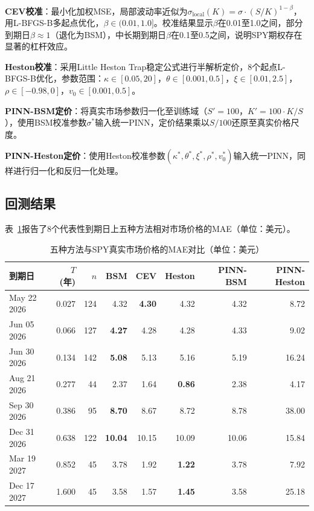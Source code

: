 \textbf{CEV校准}：最小化加权MSE，局部波动率近似为$\sigma_\text{local}(K)=\sigma\cdot(S/K)^{1-\beta}$，用L-BFGS-B多起点优化，$\beta\in(0.01,1.0]$。校准结果显示$\beta$在0.01至1.0之间，部分到期日$\beta\approx 1$（退化为BSM），中长期到期日$\beta$在0.1至0.5之间，说明SPY期权存在显著的杠杆效应。

\textbf{Heston校准}：采用Little Heston Trap稳定公式\cite{albrecher2007little}进行半解析定价，8个起点L-BFGS-B优化，参数范围：$\kappa\in[0.05,20]$，$\theta\in[0.001,0.5]$，$\xi\in[0.01,2.5]$，$\rho\in[-0.98,0]$，$v_0\in[0.001,0.5]$。

\textbf{PINN-BSM定价}：将真实市场参数归一化至训练域（$S'=100$，$K'=100\cdot K/S$），使用BSM校准参数$\sigma^*$输入统一PINN，定价结果乘以$S/100$还原至真实价格尺度。

\textbf{PINN-Heston定价}：使用Heston校准参数$(\kappa^*,\theta^*,\xi^*,\rho^*,v_0^*)$输入统一PINN，同样进行归一化和反归一化处理。

\subsection{回测结果}

表~\ref{tab:market_results}报告了8个代表性到期日上五种方法相对市场价格的MAE（单位：美元）。

\begin{table}[htbp]
  \centering
  \caption{五种方法与SPY真实市场价格的MAE对比（单位：美元）}
  \label{tab:market_results}
  \begin{tabular}{lrrrrrrr}
    \hline
    到期日 & $T$(年) & $n$ & BSM & CEV & Heston & PINN-BSM & PINN-Heston \\
    \hline
    May 22 2026 & 0.027 & 124 & 4.32 & \textbf{4.30} & 4.32 & 4.32 & 8.72 \\
    Jun 05 2026 & 0.066 & 127 & \textbf{4.27} & 4.28 & 4.28 & 4.33 & 9.02 \\
    Jun 30 2026 & 0.134 & 142 & \textbf{5.08} & 5.13 & 5.16 & 5.19 & 16.24 \\
    Aug 21 2026 & 0.277 &  44 & 2.37 & 1.64 & \textbf{0.86} & 2.38 & 4.17 \\
    Sep 30 2026 & 0.386 &  95 & \textbf{8.70} & 8.67 & 8.72 & 8.78 & 38.00 \\
    Dec 31 2026 & 0.638 & 122 & \textbf{10.04} & 10.15 & 10.09 & 10.06 & 15.84 \\
    Mar 19 2027 & 0.852 &  45 & 3.78 & 1.92 & \textbf{1.22} & 3.78 & 7.92 \\
    Dec 17 2027 & 1.600 &  45 & 3.58 & 1.57 & \textbf{1.45} & 3.58 & 25.18 \\
    \hline
  \end{tabular}
\end{table}

